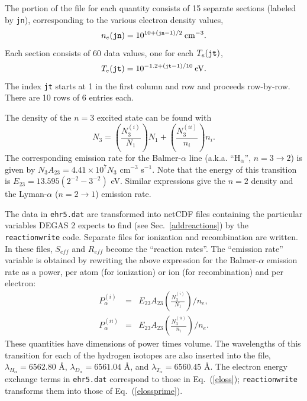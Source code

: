 \documentclass[12pt]{report}
\begin{document}
The portion of the file for each quantity consists of 15 separate sections 
(labeled by {\tt jn}), corresponding to the various electron density values,
\begin{equation}
n_{e}({\tt jn}) =  10^{10 + ({\tt jn} - 1)/2} \: {\rm cm}^{-3}.
\end{equation}
Each section consists of 60 data values, one for each $T_{e} ({\tt jt})$,
\begin{equation}
T_{e}({\tt jt}) =  10^{-1.2 + ({\tt jt} - 1)/10} \: {\rm eV}.
\end{equation}
The index {\tt jt} starts at 1 in the first column and row and proceeds 
row-by-row. There are 10 rows of 6 entries each.

The density of the $n = 3$ excited state can be found with
\begin{equation}
N_{3} = \left( \frac{N^{(i)}_{3}}{N_{1}}\right) N_{1} + 
\left( \frac{N^{(ii)}_{3}}{n_{i}}\right) n_{i}.
\end{equation}
The corresponding emission rate for 
the Balmer-$\alpha$ line (a.k.a. ``H$_{\alpha}$'', $n = 3 \rightarrow 2$)
is given by 
$N_{3} A_{23} = 4.41 \times
10^{7} N_{3}$ cm$^{-3}$ s$^{-1}$.  
Note that the energy of this transition is 
$E_{23} = 13.595 (2^{-2} - 3^{-2})$ eV.
Similar expressions give the
$n=2$ density and the Lyman-$\alpha$ ($n = 2 \rightarrow 1$) emission
rate. 

The data in {\tt ehr5.dat} are transformed into netCDF files 
containing the particular variables DEGAS 2 expects to find
(see Sec.~\ref{addreactions}) by the {\tt reactionwrite}
code.  Separate files for ionization and recombination
are written.  In these files, $S_{eff}$ and $R_{eff}$ become
the ``reaction rates''.  The ``emission rate'' variable 
is obtained by rewriting the above expression
for the Balmer-$\alpha$ emission rate as a power,
per atom (for ionization) or ion (for 
recombination) and per electron:
\begin{eqnarray}
P_{\alpha}^{(i)} & = & E_{23} A_{23} \left( \frac{N_{3}^{(i)}}{N_{1}} \right)
/ n_{e}, \label{pemiti} \\
P_{\alpha}^{(ii)} & = & E_{23} A_{23} \left( \frac{N_{3}^{(ii)}}{n_{i}} \right)
/ n_{e}. \label{pemitii}
\end{eqnarray}
These quantities have dimensions of power times volume.
The wavelengths of this transition for each of the
hydrogen isotopes are also inserted into the
file, $\lambda_{H_{\alpha}} = 6562.80 $ \AA, 
$\lambda_{D_{\alpha}} = 6561.04 $ \AA, and $\lambda_{T_{\alpha}}
= 6560.45 $ \AA.
The electron energy exchange terms in {\tt ehr5.dat} correspond
to those in Eq.~(\ref{eloss}); {\tt reactionwrite} transforms
them into those of Eq.~(\ref{elossprime}).
\end{document}

